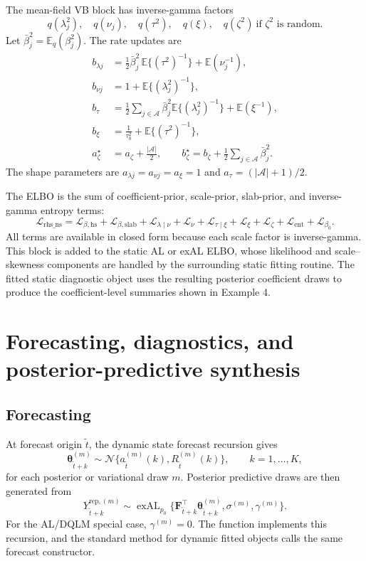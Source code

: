 \documentclass{jss}
\newcommand{\vect}[1]{\boldsymbol{#1}}
\newcommand{\mat}[1]{\mathbf{#1}}
\newcommand{\N}{\mathcal{N}}
\newcommand{\exAL}{\operatorname{exAL}}
\renewcommand{\E}{\mathbb{E}}
\newcommand{\elbo}{\mathcal{L}}
\begin{document}
The mean-field VB block has inverse-gamma factors
\[
q(\lambda_j^2),\quad q(\nu_j),\quad q(\tau^2),\quad q(\xi),
\quad q(\zeta^2)\ \text{if }\zeta^2\text{ is random}.
\]
Let $\bar\beta_j^2=\E_q(\beta_j^2)$. The rate updates are
\begin{align}
b_{\lambda j}
&=\frac{1}{2}\bar\beta_j^2\,\E\{(\tau^2)^{-1}\}
+\E(\nu_j^{-1}),\\
b_{\nu j}
&=1+\E\{(\lambda_j^2)^{-1}\},\\
b_\tau
&=\frac{1}{2}\sum_{j\in\mathcal{A}}\bar\beta_j^2
\E\{(\lambda_j^2)^{-1}\}+\E(\xi^{-1}),\\
b_\xi
&=\frac{1}{\tau_0^2}+\E\{(\tau^2)^{-1}\},\\
a_\zeta^\star
&=a_\zeta+\frac{|\mathcal{A}|}{2},\qquad
b_\zeta^\star=b_\zeta+\frac{1}{2}\sum_{j\in\mathcal{A}}\bar\beta_j^2.
\label{eq:rhs_ns_vb_updates}
\end{align}
The shape parameters are
$a_{\lambda j}=a_{\nu j}=a_\xi=1$ and
$a_\tau=(|\mathcal{A}|+1)/2$.

The  ELBO is the sum of coefficient-prior, scale-prior,
slab-prior, and inverse-gamma entropy terms:
\begin{equation}
\elbo_{\mathrm{rhs\_ns}}
=
\elbo_{\beta,\mathrm{hs}}
+\elbo_{\beta,\mathrm{slab}}
+\elbo_{\lambda\mid\nu}
+\elbo_{\nu}
+\elbo_{\tau\mid\xi}
+\elbo_{\xi}
+\elbo_{\zeta}
+\elbo_{\mathrm{ent}}
+\elbo_{\beta_0}.
\label{eq:rhs_ns_elbo}
\end{equation}
All terms are available in closed form because each scale factor is
inverse-gamma. This block is added to the static AL or exAL ELBO, whose
likelihood and scale--skewness components are handled by the surrounding
static fitting routine. The fitted static diagnostic object uses the resulting
posterior coefficient draws to produce the coefficient-level summaries shown
in Example 4.

\section{Forecasting, diagnostics, and posterior-predictive synthesis}
\label{sec:forecast_diagnostics_synthesis}

\subsection{Forecasting}

At forecast origin $\tilde t$, the dynamic state forecast recursion gives
\[
\vect{\theta}_{\tilde t+k}^{(m)}
\sim
\N\{a_{\tilde t}^{(m)}(k),R_{\tilde t}^{(m)}(k)\},
\qquad k=1,\ldots,K,
\]
for each posterior or variational draw $m$. Posterior predictive draws are
then generated from
\begin{equation}
Y_{\tilde t+k}^{\mathrm{rep},(m)}
\sim
\exAL_{p_0}\{
\mat{F}_{\tilde t+k}^\top\vect{\theta}_{\tilde t+k}^{(m)},
\sigma^{(m)},\gamma^{(m)}
\}.
\label{eq:forecast_postpred}
\end{equation}
For the AL/DQLM special case, $\gamma^{(m)}=0$. The function
 implements this recursion, and the standard
 method for dynamic fitted objects calls the same forecast
constructor.
\end{document}
